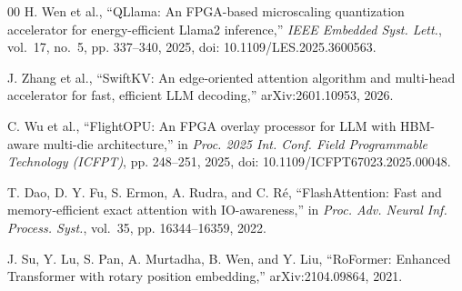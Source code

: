 \documentclass[conference]{IEEEtran}
\begin{document}
\begin{thebibliography}{00}
H. Wen et al., ``QLlama: An FPGA-based microscaling quantization accelerator
for energy-efficient Llama2 inference,'' \emph{IEEE Embedded Syst. Lett.},
vol.~17, no.~5, pp. 337--340, 2025,
doi: 10.1109/LES.2025.3600563.

J. Zhang et al., ``SwiftKV: An edge-oriented attention algorithm and
multi-head accelerator for fast, efficient LLM decoding,'' arXiv:2601.10953,
2026.

C. Wu et al., ``FlightOPU: An FPGA overlay processor for LLM with HBM-aware
multi-die architecture,'' in \emph{Proc. 2025 Int. Conf. Field Programmable
Technology (ICFPT)}, pp. 248--251, 2025,
doi: 10.1109/ICFPT67023.2025.00048.

T. Dao, D. Y. Fu, S. Ermon, A. Rudra, and C. R\'e,
``FlashAttention: Fast and memory-efficient exact attention with
IO-awareness,'' in \emph{Proc. Adv. Neural Inf. Process. Syst.}, vol.~35,
pp. 16344--16359, 2022.

J. Su, Y. Lu, S. Pan, A. Murtadha, B. Wen, and Y. Liu, ``RoFormer: Enhanced
Transformer with rotary position embedding,'' arXiv:2104.09864, 2021.

\end{thebibliography}
\end{document}
